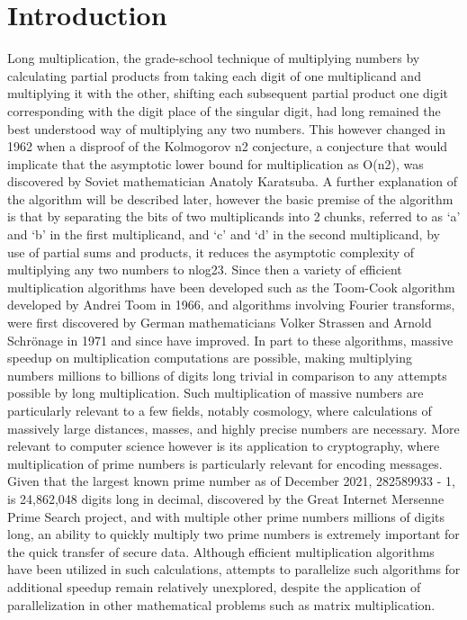 \documentclass[12pt]{article}
\begin{document}
\section{Introduction}
Long multiplication, the grade-school technique of multiplying numbers by calculating partial products from taking each digit of one multiplicand and multiplying it with the other, shifting each subsequent partial product one digit corresponding with the digit place of the singular digit, had long remained the best understood way of multiplying any two numbers. This however changed in 1962 when a disproof of the Kolmogorov n2 conjecture, a conjecture that would implicate that the asymptotic lower bound for multiplication as O(n2), was discovered by Soviet mathematician Anatoly Karatsuba. A further explanation of the algorithm will be described later, however the basic premise of the algorithm is that by separating the bits of two multiplicands into 2 chunks, referred to as ‘a’ and ‘b’ in the first multiplicand, and ‘c’ and ‘d’ in the second multiplicand, by use of partial sums and products, it reduces the asymptotic complexity of multiplying any two numbers to nlog23. Since then a variety of efficient multiplication algorithms have been developed such as the Toom-Cook algorithm developed by Andrei Toom in 1966, and algorithms involving Fourier transforms, were first discovered by German mathematicians Volker Strassen and Arnold Schrönage in 1971 and since have improved. In part to these algorithms, massive speedup on multiplication computations are possible, making multiplying numbers millions to billions of digits long trivial in comparison to any attempts possible by long multiplication. Such multiplication of massive numbers are particularly relevant to a few fields, notably cosmology, where calculations of massively large distances, masses, and highly precise numbers are necessary. More relevant to computer science however is its application to cryptography, where multiplication of prime numbers is particularly relevant for encoding messages. Given that the largest known prime number as of December 2021, 282589933 - 1, is 24,862,048 digits long in decimal, discovered by the Great Internet Mersenne Prime Search project, and with multiple other prime numbers millions of digits long, an ability to quickly multiply two prime numbers is extremely important for the quick transfer of secure data. Although efficient multiplication algorithms have been utilized in such calculations, attempts to parallelize such algorithms for additional speedup remain relatively unexplored, despite the application of parallelization in other mathematical problems such as matrix multiplication.
\end{document}
